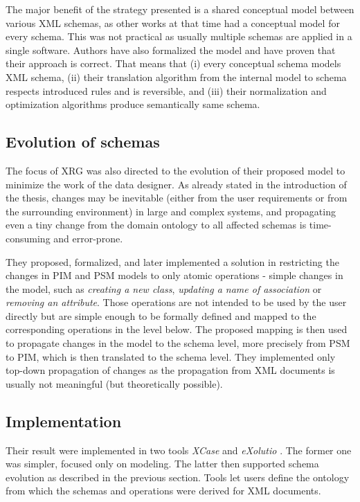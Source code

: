 The major benefit of the strategy presented is a shared conceptual model between various XML schemas, as other works at that time had a conceptual model for every schema. This was not practical as usually multiple schemas are applied in a single software. Authors have also formalized the model and have proven that their approach is correct. That means that (i) every conceptual schema models XML schema, (ii) their translation algorithm from the internal model to schema respects introduced rules and is reversible, and (iii) their normalization and optimization algorithms produce semantically same schema.

\subsection{Evolution of schemas}

The focus of XRG was also directed to the evolution \cite{nevcasky2012evolution} of their proposed model to minimize the work of the data designer. As already stated in the introduction of the thesis, changes may be inevitable (either from the user requirements or from the surrounding environment) in large and complex systems, and propagating even a tiny change from the domain ontology to all affected schemas is time-consuming and error-prone.

They proposed, formalized, and later implemented a solution in restricting the changes in PIM and PSM models to only atomic operations - simple changes in the model, such as \textit{creating a new class}, \textit{updating a name of association} or \textit{removing an attribute}. Those operations are not intended to be used by the user directly but are simple enough to be formally defined and mapped to the corresponding operations in the level below. The proposed mapping is then used to propagate changes in the model to the schema level, more precisely from PSM to PIM, which is then translated to the schema level. They implemented only top-down propagation of changes as the propagation from XML documents is usually not meaningful (but theoretically possible).

\subsection{Implementation}

Their result were implemented in two tools \textit{XCase} \cite{xcase} and \textit{eXolutio} \cite{exolutio}. The former one was simpler, focused only on modeling. The latter then supported schema evolution as described in the previous section. Tools let users define the ontology from which the schemas and operations were derived for XML documents.

